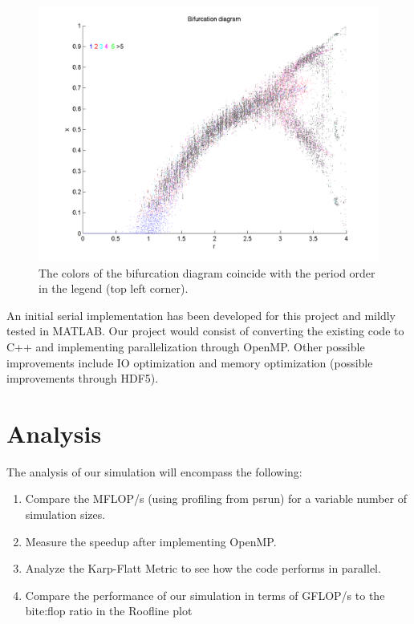 \documentclass[12pt]{article}
\newcommand{\be}{\begin{enumerate}}
\newcommand{\ee}{\end{enumerate}}
\begin{document}
\begin{figure}[H]
	\begin{center}
		\includegraphics[scale=0.5]{bif}
\caption{The colors of the bifurcation diagram coincide with the
  period order in the legend (top left corner).}
	\end{center}
\end{figure}
An initial serial implementation has been developed for this project and mildly tested in
MATLAB. Our project would consist of converting the existing code to
C++ and implementing parallelization through OpenMP. Other possible improvements include
IO optimization and memory optimization (possible improvements through
HDF5). 

\section{Analysis}
The analysis of our simulation will encompass the following:
\be
\item Compare the MFLOP/s (using profiling from psrun) for a variable number of simulation
sizes. 
\item Measure the speedup after implementing OpenMP. 
\item Analyze the Karp-Flatt Metric to see how the code
  performs in parallel. 
\item Compare the performance of our simulation in terms of GFLOP/s to
  the bite:flop ratio in the Roofline plot
\ee
\end{document}
